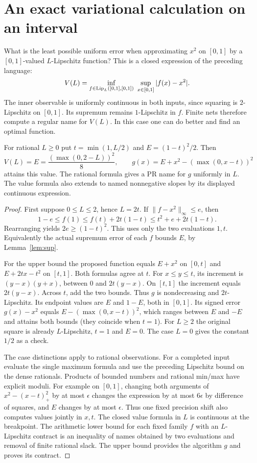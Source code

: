 \section{An exact variational calculation on an interval}
\label{sec:var}

What is the least possible uniform error when approximating $x^2$ on $[0,1]$ by a $[0,1]$-valued $L$-Lipschitz function? This is a closed expression of the preceding language:
\[
 V(L)=\inf_{f\in\Lip_L([0,1],[0,1])}\ \sup_{x\in[0,1]}|f(x)-x^2|.
\]
The inner observable is uniformly continuous in both inputs, since squaring is $2$-Lipschitz on $[0,1]$. Its supremum remains $1$-Lipschitz in $f$. Finite nets therefore compute a regular name for $V(L)$. In this case one can do better and find an optimal function.

\begin{theorem}\label{thm:minimax}
For rational $L\ge0$ put $t=\min(1,L/2)$ and $E=(1-t)^2/2$. Then
\[
 V(L)=E=\frac{(\max(0,2-L))^2}{8},\qquad
 g(x)=E+x^2-(\max(0,x-t))^2
\]
attains this value. The rational formula gives a PR name for $g$ uniformly in $L$. The value formula also extends to named nonnegative slopes by its displayed continuous expression.
\end{theorem}
\begin{proof}
First suppose $0\le L\le2$, hence $L=2t$. If $\|f-x^2\|_\infty\le e$, then
\[
 1-e\le f(1)\le f(t)+2t(1-t)\le t^2+e+2t(1-t).
\]
Rearranging yields $2e\ge(1-t)^2$. This uses only the two evaluations $1,t$. Equivalently the actual supremum error of each $f$ bounds $E$, by Lemma~\ref{lem:sup}.

For the upper bound the proposed function equals $E+x^2$ on $[0,t]$ and $E+2tx-t^2$ on $[t,1]$. Both formulas agree at $t$. For $x\le y\le t$, its increment is $(y-x)(y+x)$, between $0$ and $2t(y-x)$. On $[t,1]$ the increment equals $2t(y-x)$. Across $t$, add the two bounds. Thus $g$ is nondecreasing and $2t$-Lipschitz. Its endpoint values are $E$ and $1-E$, both in $[0,1]$. Its signed error $g(x)-x^2$ equals $E-(\max(0,x-t))^2$, which ranges between $E$ and $-E$ and attains both bounds (they coincide when $t=1$). For $L\ge2$ the original square is already $L$-Lipschitz, $t=1$ and $E=0$. The case $L=0$ gives the constant $1/2$ as a check.

The case distinctions apply to rational observations. For a completed input evaluate the single maximum formula and use the preceding Lipschitz bound on the dense rationals. Products of bounded numbers and rational min/max have explicit moduli. For example on $[0,1]$, changing both arguments of $x^2-(x-t)_+^2$ by at most $\epsilon$ changes the expression by at most $6\epsilon$ by difference of squares, and $E$ changes by at most $\epsilon$. Thus one fixed precision shift also computes values jointly in $x,t$. The closed value formula in $L$ is continuous at the breakpoint. The arithmetic lower bound for each fixed family $f$ with an $L$-Lipschitz contract is an inequality of names obtained by two evaluations and removal of finite rational slack. The upper bound provides the algorithm $g$ and proves its contract.
\end{proof}

